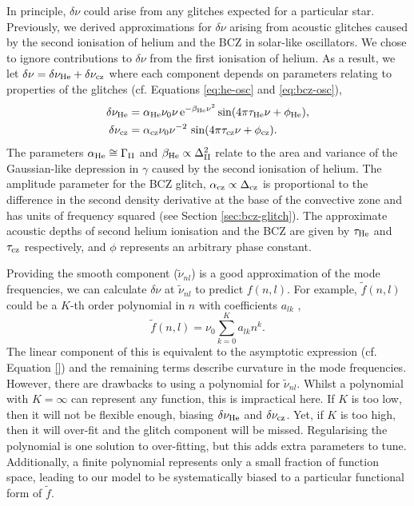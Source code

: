 In principle, \(\delta\nu\) could arise from any glitches expected for a particular star. Previously, we derived approximations for \(\delta\nu\) arising from acoustic glitches caused by the second ionisation of helium and the BCZ in solar-like oscillators. We chose to ignore contributions to \(\delta\nu\) from the first ionisation of helium. As a result, we let \(\delta\nu = \delta\nu_{{\mathrm{He}}} + \delta\nu_{{\mathrm{cz}}}\) where each component depends on parameters relating to properties of the glitches (cf. Equations \ref{eq:he-osc} and \ref{eq:bcz-osc}),
%
\begin{align}
    \delta\nu_{{\mathrm{He}}} &= \alpha_{{\mathrm{He}}} \nu_0 \nu \, \mathrm{e}^{-\beta_{{\mathrm{He}}} \nu^2} \sin(4\pi\tau_{{\mathrm{He}}}\nu + \phi_{{\mathrm{He}}}), \label{eq:he-glitch}\\
    \delta\nu_{{\mathrm{cz}}} &= \alpha_{{\mathrm{cz}}} \nu_0 \nu^{-2} \, \sin(4\pi\tau_{{\mathrm{cz}}}\nu + \phi_{{\mathrm{cz}}}). \label{eq:bcz-glitch}
\end{align}
%
The parameters \(\alpha_{{\mathrm{He}}} \cong \Gamma_{{\mathrm{II}}}\) and \(\beta_{{\mathrm{He}}} \propto \Delta_{{\mathrm{II}}}^2\) relate to the area and variance of the Gaussian-like depression in \(\gamma\) caused by the second ionisation of helium. The amplitude parameter for the BCZ glitch, \(\alpha_{{\mathrm{cz}}} \propto \Delta_{{\mathrm{cz}}}\) is proportional to the difference in the second density derivative at the base of the convective zone and has units of frequency squared (see Section \ref{sec:bcz-glitch}). The approximate acoustic depths of second helium ionisation and the BCZ are given by \(\tau_{{\mathrm{He}}}\) and \(\tau_{{\mathrm{cz}}}\) respectively, and \(\phi\) represents an arbitrary phase constant.

Providing the smooth component (\(\tilde{\nu}_{nl}\)) is a good approximation of the mode frequencies, we can calculate \(\delta\nu\) at \(\tilde{\nu}_{nl}\) to predict \(f(n, l)\). For example, \(\tilde{f}(n,l)\) could be a \(K\)-th order polynomial in \(n\) with coefficients \(a_{lk}\) \citep[e.g.][]{Kjeldsen.Bedding.ea2005,Ulrich1986},
%
\begin{equation}
    \tilde{f}(n, l) = \nu_0 \sum_{k=0}^{K} a_{lk} n^k. \label{eq:poly}
\end{equation}
%
The linear component of this is equivalent to the asymptotic expression (cf. Equation \ref{}) and the remaining terms describe curvature in the mode frequencies. However, there are drawbacks to using a polynomial for \(\tilde{\nu}_{nl}\). Whilst a polynomial with \(K = \infty\) can represent any function, this is impractical here. If \(K\) is too low, then it will not be flexible enough, biasing \(\delta\nu_{{\mathrm{He}}}\) and \(\delta\nu_{{\mathrm{cz}}}\). Yet, if \(K\) is too high, then it will over-fit and the glitch component will be missed. Regularising the polynomial is one solution to over-fitting, but this adds extra parameters to tune. Additionally, a finite polynomial represents only a small fraction of function space, leading to our model to be systematically biased to a particular functional form of \(\tilde{f}\).

